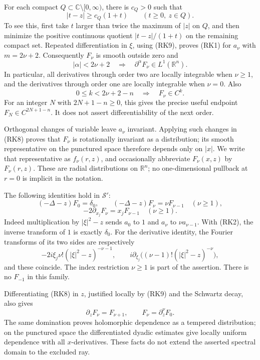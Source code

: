 \documentclass[
  11pt,
]{article}
\begin{document}
For each compact \(Q\subset\mathbb C\setminus[0,\infty)\), there is
\(c_Q>0\) such that \[
 |t-z|\geq c_Q(1+t)\qquad(t\geq0,\ z\in Q).
 \tag{RK9}
\] To see this, first take \(t\) larger than twice the maximum of
\(|z|\) on \(Q\), and then minimize the positive continuous quotient
\(|t-z|/(1+t)\) on the remaining compact set. Repeated differentiation
in \(\xi\), using (RK9), proves (RK1) for \(a_\nu\) with \(m=2\nu+2\).
Consequently \(F_\nu\) is smooth outside zero and \[
 |\alpha|<2\nu+2\quad\Longrightarrow\quad
 \partial^\alpha F_\nu\in L^1(\mathbb R^n).
 \tag{RK10}
\] In particular, all derivatives through order two are locally
integrable when \(\nu\geq1\), and the derivatives through order one are
locally integrable when \(\nu=0\). Also \[
 0\leq k<2\nu+2-n\quad\Longrightarrow\quad F_\nu\in C^k.
 \tag{RK11}
\] For an integer \(N\) with \(2N+1-n\geq0\), this gives the precise
useful endpoint \(F_N\in C^{2N+1-n}\). It does not assert
differentiability of the next order.

Orthogonal changes of variable leave \(a_\nu\) invariant. Applying such
changes in (RK8) proves that \(F_\nu\) is rotationally invariant as a
distribution; its smooth representative on the punctured space therefore
depends only on \(|x|\). We write that representative as \(f_\nu(r,z)\),
and occasionally abbreviate \(F_\nu(x,z)\) by \(F_\nu(r,z)\). These are
radial distributions on \(\mathbb R^n\); no one-dimensional pullback at
\(r=0\) is implicit in the notation.

The following identities hold in \(\mathcal S'\): \[
 (-\Delta-z)F_0=\delta_0,\qquad
 (-\Delta-z)F_\nu=\nu F_{\nu-1}\quad(\nu\geq1),
 \tag{RK12}
\] \[
 -2\partial_{x_j}F_\nu=x_jF_{\nu-1}\quad(\nu\geq1).
 \tag{RK13}
\] Indeed multiplication by \(|\xi|^2-z\) sends \(a_0\) to \(1\) and
\(a_\nu\) to \(\nu a_{\nu-1}\). With (RK2), the inverse transform of
\(1\) is exactly \(\delta_0\). For the derivative identity, the Fourier
transforms of its two sides are respectively \[
 -2i\xi_j\nu!(|\xi|^2-z)^{-\nu-1},\qquad
 i\partial_{\xi_j}\big((\nu-1)!(|\xi|^2-z)^{-\nu}\big),
\] and these coincide. The index restriction \(\nu\geq1\) is part of the
assertion. There is no \(F_{-1}\) in this family.

Differentiating (RK8) in \(z\), justified locally by (RK9) and the
Schwartz decay, also gives \[
 \partial_zF_\nu=F_{\nu+1},\qquad F_\nu=\partial_z^\nu F_0.
 \tag{RK14}
\] The same domination proves holomorphic dependence as a tempered
distribution; on the punctured space the differentiated dyadic estimates
give locally uniform dependence with all \(x\)-derivatives. These facts
do not extend the asserted spectral domain to the excluded ray.
\end{document}
